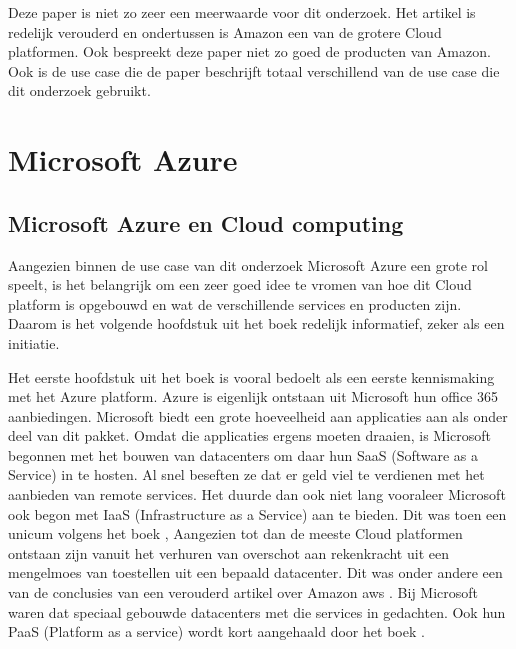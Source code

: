 Deze paper \autocite{Jackson2010} is niet zo zeer een meerwaarde voor dit onderzoek. Het artikel is redelijk verouderd en ondertussen is Amazon een van de grotere Cloud platformen. Ook bespreekt deze paper niet zo goed de producten van Amazon. Ook is de use case die de paper beschrijft totaal verschillend van de use case die dit onderzoek gebruikt. 

\section{Microsoft Azure}
\subsection{Microsoft Azure en Cloud computing}
Aangezien binnen de use case van dit onderzoek Microsoft Azure een grote rol speelt, is het belangrijk om een zeer goed idee te vromen van hoe dit Cloud platform is opgebouwd en wat de verschillende services en producten zijn. Daarom is het volgende hoofdstuk uit het boek \autocite{Copeland2015} redelijk informatief, zeker als een initiatie.

Het eerste hoofdstuk uit het boek \autocite{Copeland2015} is vooral bedoelt als een eerste kennismaking met het Azure platform. Azure is eigenlijk ontstaan uit Microsoft hun office 365 aanbiedingen. Microsoft biedt een grote hoeveelheid aan applicaties aan als onder deel van dit pakket. Omdat die applicaties ergens moeten draaien, is Microsoft begonnen met het bouwen van datacenters om daar hun SaaS (Software as a Service) in te hosten. Al snel beseften ze dat er geld viel te verdienen met het aanbieden van remote services. Het duurde dan ook niet lang vooraleer Microsoft ook begon met IaaS (Infrastructure as a Service) aan te bieden. Dit was toen een unicum volgens het boek \autocite{Copeland2015}, Aangezien tot dan de meeste Cloud platformen ontstaan zijn vanuit het verhuren van overschot aan rekenkracht uit een mengelmoes van toestellen uit een bepaald datacenter. Dit was onder andere een van de conclusies van een verouderd artikel over Amazon aws \autocite{Jackson2010}. Bij Microsoft waren dat speciaal gebouwde datacenters met die services in gedachten. Ook hun PaaS (Platform as a service) wordt kort aangehaald door het boek \autocite{Copeland2015}.

